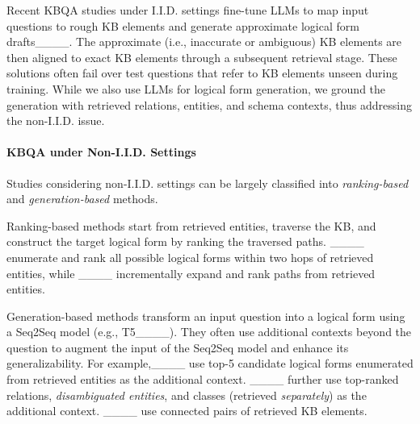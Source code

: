 Recent KBQA studies under I.I.D. settings fine-tune LLMs to map input questions to rough KB elements and generate approximate logical form drafts____. %
The approximate (i.e., inaccurate or ambiguous) KB elements are then aligned to exact KB elements through a subsequent retrieval stage. These solutions often fail over test questions that refer to KB elements unseen during training. While we also use LLMs for logical form generation, we ground the generation with retrieved relations, entities, and  schema contexts, thus addressing the non-I.I.D. issue. 


\paragraph{KBQA under Non-I.I.D. Settings}

Studies considering non-I.I.D. settings can be largely classified into \emph{ranking-based} and \emph{generation-based} methods. 

Ranking-based methods start from retrieved entities, traverse the KB, and construct the target logical form by ranking the traversed paths.  
____ enumerate and rank all possible logical forms within two hops  of retrieved entities, while ____ incrementally expand and rank paths from retrieved entities. %

Generation-based methods transform an input question into a logical form using a Seq2Seq model (e.g., T5____).
They often use additional contexts beyond the question to augment the input of the Seq2Seq model and enhance its generalizability. For example,____ use  top-5 candidate logical forms enumerated from retrieved entities as the additional context. 
____ further use top-ranked relations, \emph{disambiguated entities}, and classes (retrieved \emph{separately}) as the additional context. ____ use connected pairs of retrieved KB elements. 


